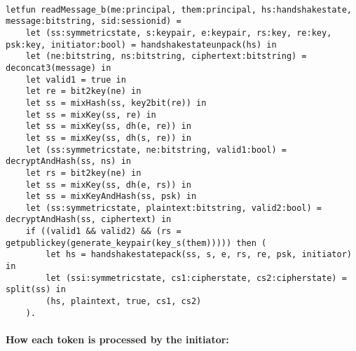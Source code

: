 \begin{lstlisting}

letfun readMessage_b(me:principal, them:principal, hs:handshakestate, message:bitstring, sid:sessionid) =
	let (ss:symmetricstate, s:keypair, e:keypair, rs:key, re:key, psk:key, initiator:bool) = handshakestateunpack(hs) in
	let (ne:bitstring, ns:bitstring, ciphertext:bitstring) = deconcat3(message) in
	let valid1 = true in
	let re = bit2key(ne) in
	let ss = mixHash(ss, key2bit(re)) in
	let ss = mixKey(ss, re) in
	let ss = mixKey(ss, dh(e, re)) in
	let ss = mixKey(ss, dh(s, re)) in
	let (ss:symmetricstate, ne:bitstring, valid1:bool) = decryptAndHash(ss, ns) in
	let rs = bit2key(ne) in
	let ss = mixKey(ss, dh(e, rs)) in
	let ss = mixKeyAndHash(ss, psk) in
	let (ss:symmetricstate, plaintext:bitstring, valid2:bool) = decryptAndHash(ss, ciphertext) in
	if ((valid1 && valid2) && (rs = getpublickey(generate_keypair(key_s(them))))) then (
		let hs = handshakestatepack(ss, s, e, rs, re, psk, initiator) in
		let (ssi:symmetricstate, cs1:cipherstate, cs2:cipherstate) = split(ss) in
		(hs, plaintext, true, cs1, cs2)
	).

\end{lstlisting}

\paragraph{How each token is processed by the initiator:}$ $

